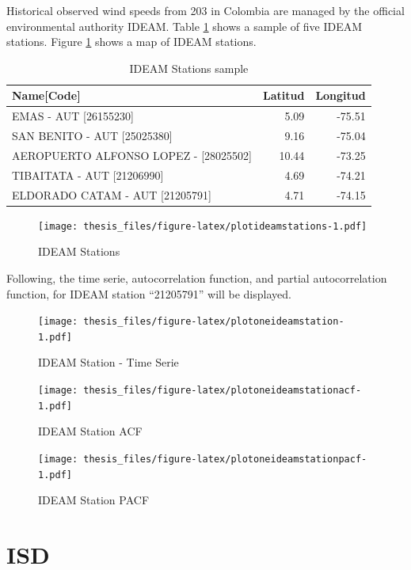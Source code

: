 \documentclass[12pt,twoside]{reedthesis}
\begin{document}
Historical observed wind speeds from 203 in Colombia are managed by the official environmental authority IDEAM. Table \ref{tab:tableideamstations} shows a sample of five IDEAM stations. Figure \ref{fig:plotideamstations} shows a map of IDEAM stations.
\begin{longtable}[t]{lrr}
\caption[IDEAM Stations]{\label{tab:tableideamstations}IDEAM Stations sample}\\
\toprule
Name[Code] & Latitud & Longitud\\
\midrule
EMAS - AUT [26155230] & 5.09 & -75.51\\
SAN BENITO - AUT [25025380] & 9.16 & -75.04\\
AEROPUERTO ALFONSO LOPEZ - [28025502] & 10.44 & -73.25\\
TIBAITATA - AUT [21206990] & 4.69 & -74.21\\
ELDORADO CATAM - AUT [21205791] & 4.71 & -74.15\\
\bottomrule
\end{longtable}
\begin{figure}
\centering
\texttt{[image: thesis\_files/figure-latex/plotideamstations-1.pdf]}
\caption{\label{fig:plotideamstations}IDEAM Stations}
\end{figure}
Following, the time serie, autocorrelation function, and partial autocorrelation function, for IDEAM station ``21205791'' will be displayed.
\begin{figure}
\centering
\texttt{[image: thesis\_files/figure-latex/plotoneideamstation-1.pdf]}
\caption{\label{fig:plotoneideamstation}IDEAM Station - Time Serie}
\end{figure}
\begin{figure}
\centering
\texttt{[image: thesis\_files/figure-latex/plotoneideamstationacf-1.pdf]}
\caption{\label{fig:plotoneideamstationacf}IDEAM Station ACF}
\end{figure}
\begin{figure}
\centering
\texttt{[image: thesis\_files/figure-latex/plotoneideamstationpacf-1.pdf]}
\caption{\label{fig:plotoneideamstationpacf}IDEAM Station PACF}
\end{figure}
\hypertarget{isd}{%
\section{ISD}\label{isd}}
\end{document}
